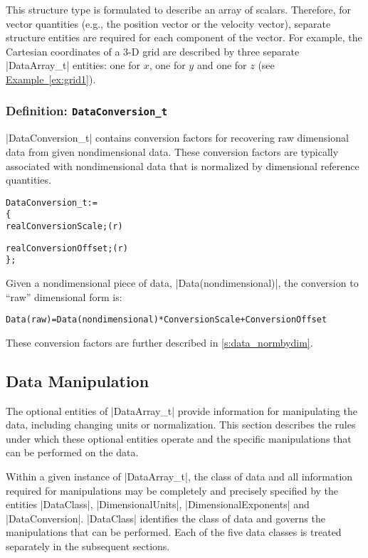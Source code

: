 This structure type is formulated to describe an array of scalars.
Therefore, for vector quantities (e.g., the position vector or the velocity
vector), separate structure entities are required for each component of the
vector.  For example, the Cartesian coordinates of a 3-D grid are described
by three separate |DataArray_t| entities: one for $x$, one for $y$ and one
for $z$ (see \hyperref[ex:grid1]{Example~\ref*{ex:grid1}}).

\subsubsection{Definition: \texttt{DataConversion\_t}}
\label{s:DataConversion}

|DataConversion_t| contains conversion factors for recovering raw
dimensional data from given nondimensional data.
These conversion factors are typically associated with nondimensional
data that is normalized by dimensional reference quantities.
\begin{alltt}
  DataConversion\_t :=
    \{
    real ConversionScale ;                                                  (r)
    
    real ConversionOffset ;                                                 (r)
    \} ;
\end{alltt}
Given a nondimensional piece of data, |Data(nondimensional)|, the
conversion to ``raw'' dimensional form is:
\begin{alltt}
  Data(raw) = Data(nondimensional)*ConversionScale + ConversionOffset
\end{alltt}
These conversion factors are further described in \autoref{s:data_normbydim}. 

\subsection{Data Manipulation}
\label{s:data_manip}

The optional entities of |DataArray_t| provide information for manipulating
the data, including changing units or normalization.  This section describes
the rules under which these optional entities operate and the specific
manipulations that can be performed on the data.

Within a given instance of |DataArray_t|, the class of data and all
information required for manipulations may be completely and precisely
specified by the entities |DataClass|, |DimensionalUnits|,
|DimensionalExponents| and |DataConversion|.
|DataClass| identifies the class of data and governs the manipulations
that can be performed.
Each of the five data classes is treated separately in the subsequent
sections.

